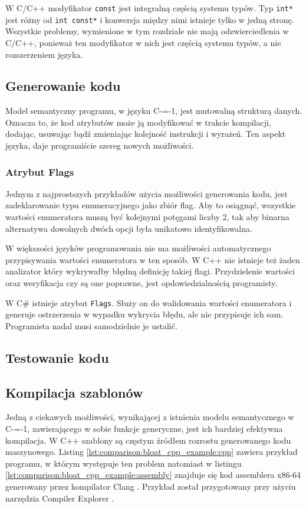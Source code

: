 W C/C++ modyfikator \lstinline{const} jest integralną częścią systemu typów.
Typ \lstinline{int*} jest różny od \lstinline{int const*} i konwersja między nimi istnieje tylko w jedną stronę.
Wszystkie problemy, wymienione w tym rozdziale nie mają odzwierciedlenia w C/C++, ponieważ ten modyfikator w nich jest częścią systemu typów, a nie rozszerzeniem języka.

\subsection{Generowanie kodu}

Model semantyczny programu, w języku C-=-1, jest mutowalną strukturą danych.
Oznacza to, że kod atrybutów może ją modyfikować w trakcie kompilacji, dodając, usuwając bądź zmieniając kolejność instrukcji i wyrażeń.
Ten aspekt języka, daje programiście szereg nowych możliwości.

\subsubsection{Atrybut Flags}

Jednym z najprostszych przykładów użycia możliwości generowania kodu, jest zadeklarowanie typu enumeracyjnego jako zbiór flag.
Aby to osiągnąć, wszystkie wartości enumeratora muszą być kolejnymi potęgami liczby 2, tak aby binarna alternatywa dowolnych dwóch opcji była unikatowo identyfikowalna.%

W większości języków programowania nie ma możliwości automatycznego przypisywania wartości enumeratora w ten sposób.
W C++ nie istnieje też żaden analizator który wykrywałby błędną definicję takiej flagi.
Przydzielenie wartości oraz weryfikacja czy są one poprawne, jest opdowiedzialnością programisty.

W C\# istnieje atrybut \lstinline{Flags}.
Służy on do walidowania wartości enumeratora i generuje ostrzerzenia w wypadku wykrycia błędu, ale nie przypisuje ich sam.
Programista nadal musi samodzielnie je ustalić.


\subsection{Testowanie kodu}

\subsection{Kompilacja szablonów}
\label{comparison:template_type_erasure}
Jedną z ciekawych możliwości, wynikającej z istnienia modelu semantycznego w C-=-1, zawierającego w sobie funkcje generyczne, jest ich bardziej efektywna kompilacja.
W C++ szablony są częstym źródłem rozrostu generowanego kodu maszynowego.
Listing \ref{lst:comparison:bloat_cpp_example:cpp} zawiera przykład programu, w którym występuje ten problem natomiast w listingu \ref{lst:comparison:bloat_cpp_example:assembly} znajduje się kod assemblera x86-64 generowany przez kompilator Clang \cite{lattner2008llvm}.
Przykład został przygotowany przy użyciu narzędzia Compiler Explorer \cite{godbolt}.

